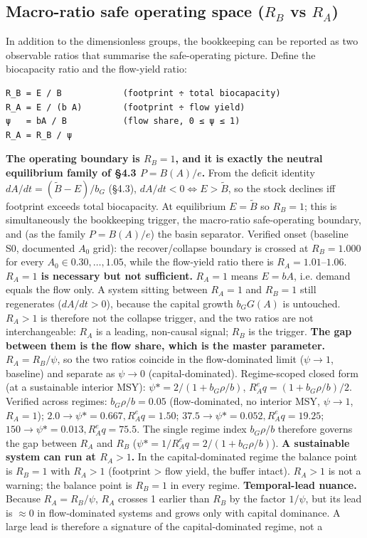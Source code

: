 \documentclass[11pt]{article}
\begin{document}
\subsection{Macro-ratio safe operating space ($R_{B}$ vs $R_{A}$)}

In addition to the dimensionless groups, the bookkeeping can be reported as two observable ratios that summarise the safe-operating picture. Define the biocapacity ratio and the flow-yield ratio:

\begingroup\small\begin{verbatim}
R_B = E / B            (footprint ÷ total biocapacity)
R_A = E / (b A)        (footprint ÷ flow yield)
ψ   = bA / B           (flow share, 0 ≤ ψ ≤ 1)
R_A = R_B / ψ
\end{verbatim}\endgroup

\textbf{The operating boundary is $R_{B} = 1$, and it is exactly the neutral equilibrium family of §4.3 $P = B(A)/e$.} From the deficit identity $dA/dt = (\tilde{B} - E)/b_{G}$ (§4.3), $dA/dt < 0 \iff{} E > \tilde{B}$, so the stock declines iff footprint exceeds total biocapacity. At equilibrium $E = \tilde{B}$ so $R_{B} = 1$; this is simultaneously the bookkeeping trigger, the macro-ratio safe-operating boundary, and (as the family $P = B(A)/e$) the basin separator. Verified onset (baseline S0, documented $A_{0}$ grid): the recover/collapse boundary is crossed at $R_{B} = 1.000$ for every $A_{0} \in{} {0.30,\ldots{},1.05}$, while the flow-yield ratio there is $R_{A} = 1.01–1.06$. \textbf{$R_{A} = 1$ is necessary but not sufficient.} $R_{A} = 1$ means $E = bA$, i.e. demand equals the flow only. A system sitting between $R_{A} = 1$ and $R_{B} = 1$ still regenerates ($dA/dt > 0$), because the capital growth $b_{G} G(A)$ is untouched. $R_{A} > 1$ is therefore not the collapse trigger, and the two ratios are not interchangeable: $R_{A}$ is a leading, non-causal signal; $R_{B}$ is the trigger. \textbf{The gap between them is the flow share, which is the master parameter.} $R_{A} = R_{B}/\psi{}$, so the two ratios coincide in the flow-dominated limit ($\psi{} \to{} 1$, baseline) and separate as $\psi{} \to{} 0$ (capital-dominated). Regime-scoped closed form (at a sustainable interior MSY): $\psi{}* = 2/(1 + b_{G}\rho{}/b)$, $R_{A}^eq = (1 + b_{G}\rho{}/b)/2$. Verified across regimes: $b_{G}\rho{}/b = 0.05$ (flow-dominated, no interior MSY, $\psi{} \to{} 1$, $R_{A} = 1$); $2.0 \to{} \psi{}* = 0.667, R_{A}^eq = 1.50$; $37.5 \to{} \psi{}* = 0.052, R_{A}^eq = 19.25$; $150 \to{} \psi{}* = 0.013, R_{A}^eq = 75.5$. The single regime index $b_{G}\rho{}/b$ therefore governs the gap between $R_{A}$ and $R_{B}$ ($\psi{}* = 1/R_{A}^eq = 2/(1 + b_{G}\rho{}/b)$). \textbf{A sustainable system can run at $R_{A} > 1$.} In the capital-dominated regime the balance point is $R_{B} = 1$ with $R_{A} > 1$ (footprint > flow yield, the buffer intact). $R_{A} > 1$ is not a warning; the balance point is $R_{B} = 1$ in every regime. \textbf{Temporal-lead nuance.} Because $R_{A} = R_{B}/\psi{}$, $R_{A}$ crosses 1 earlier than $R_{B}$ by the factor $1/\psi{}$, but its lead is \ensuremath{\approx{}}0 in flow-dominated systems and grows only with capital dominance. A large lead is therefore a signature of the capital-dominated regime, not a 
\end{document}
